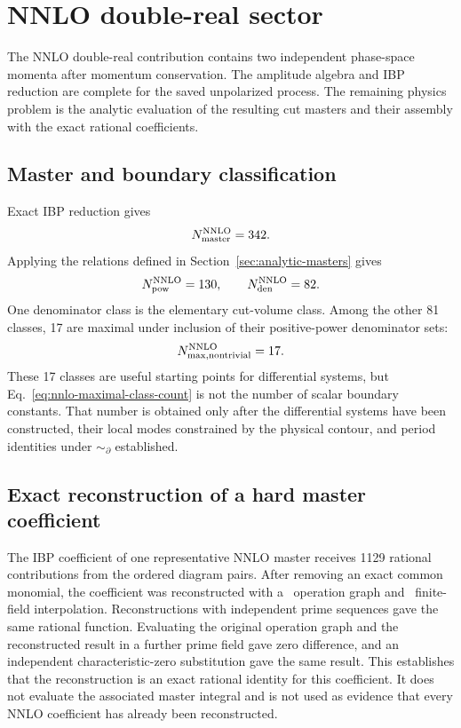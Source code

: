 \section{NNLO double-real sector}
\label{sec:nnlo-double-real}

The NNLO double-real contribution contains two independent phase-space
momenta after momentum conservation.  The amplitude algebra and IBP reduction
are complete for the saved unpolarized process.  The remaining physics problem
is the analytic evaluation of the resulting cut masters and their assembly
with the exact rational coefficients.

\subsection{Master and boundary classification}

Exact IBP reduction gives
\begin{equation}
 N_{\rm master}^{\rm NNLO}=342.
 \label{eq:nnlo-master-count}
\end{equation}
Applying the relations defined in
Section~\ref{sec:analytic-masters} gives
\begin{equation}
 N_{\rm pow}^{\rm NNLO}=130,
 \qquad
 N_{\rm den}^{\rm NNLO}=82.
 \label{eq:nnlo-equivalence-counts}
\end{equation}
One denominator class is the elementary cut-volume class.  Among the other
81 classes, 17 are maximal under inclusion of their positive-power
denominator sets:
\begin{equation}
 N_{\rm max,nontrivial}^{\rm NNLO}=17.
 \label{eq:nnlo-maximal-class-count}
\end{equation}
These 17 classes are useful starting points for differential systems, but
Eq.~\eqref{eq:nnlo-maximal-class-count} is not the number of scalar boundary
constants.  That number is obtained only after the differential systems have
been constructed, their local modes constrained by the physical contour, and
period identities under $\sim_\partial$ established.

\subsection{Exact reconstruction of a hard master coefficient}

The IBP coefficient of one representative NNLO master receives 1129 rational
contributions from the ordered diagram pairs.  After removing an exact common
monomial, the coefficient was reconstructed with a \Ratracer\ operation graph
and \FireFly\ finite-field interpolation.  Reconstructions with independent
prime sequences gave the same rational function.  Evaluating the original
operation graph and the reconstructed result in a further prime field gave
zero difference, and an independent characteristic-zero substitution gave
the same result.  This establishes that the reconstruction is an exact
rational identity for this coefficient.  It does not evaluate the associated
master integral and is not used as evidence that every NNLO coefficient has
already been reconstructed.

